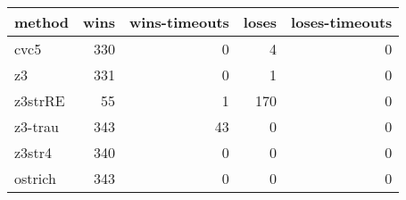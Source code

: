 \begin{tabular}{lrrrr}
\hline
 method   &   wins &   wins-timeouts &   loses &   loses-timeouts \\
\hline
 cvc5     &    330 &               0 &       4 &                0 \\
 z3       &    331 &               0 &       1 &                0 \\
 z3strRE  &     55 &               1 &     170 &                0 \\
 z3-trau  &    343 &              43 &       0 &                0 \\
 z3str4   &    340 &               0 &       0 &                0 \\
 ostrich  &    343 &               0 &       0 &                0 \\
\hline
\end{tabular}
